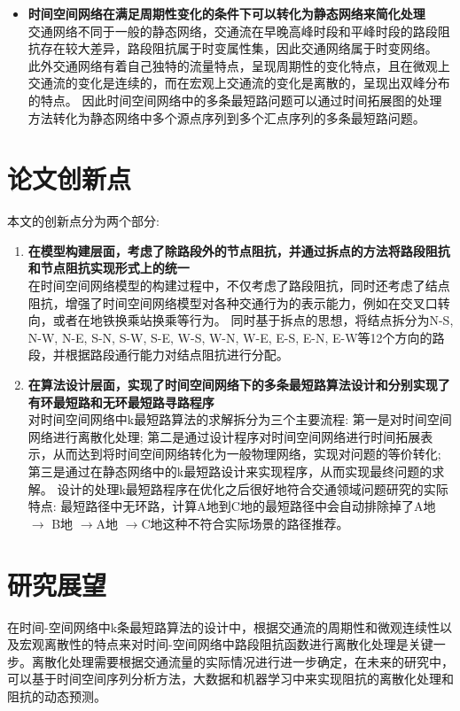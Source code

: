 \begin{itemize}
    \item \textbf{时间空间网络在满足周期性变化的条件下可以转化为静态网络来简化处理}\\
    交通网络不同于一般的静态网络，交通流在早晚高峰时段和平峰时段的路段阻抗存在较大差异，路段阻抗属于时变属性集，因此交通网络属于时变网络。
    此外交通网络有着自己独特的流量特点，呈现周期性的变化特点，且在微观上交通流的变化是连续的，而在宏观上交通流的变化是离散的，呈现出双峰分布的特点。
    因此时间空间网络中的多条最短路问题可以通过时间拓展图的处理方法转化为静态网络中多个源点序列到多个汇点序列的多条最短路问题。
\end{itemize}


\section{论文创新点}\label{sec:论文创新点}
本文的创新点分为两个部分:
\begin{enumerate}%
    \item \textbf{在模型构建层面，考虑了除路段外的节点阻抗，并通过拆点的方法将路段阻抗和节点阻抗实现形式上的统一}\\
    在时间空间网络模型的构建过程中，不仅考虑了路段阻抗，同时还考虑了结点阻抗，增强了时间空间网络模型对各种交通行为的表示能力，例如在交叉口转向，或者在地铁换乘站换乘等行为。
    同时基于拆点的思想，将结点拆分为N-S, N-W, N-E, S-N, S-W, S-E, W-S, W-N, W-E, E-S, E-N, E-W等12个方向的路段，并根据路段通行能力对结点阻抗进行分配。

    \item \textbf{在算法设计层面，实现了时间空间网络下的多条最短路算法设计和分别实现了有环最短路和无环最短路寻路程序}\\
    对时间空间网络中k最短路算法的求解拆分为三个主要流程: 第一是对时间空间网络进行离散化处理;
    第二是通过设计程序对时间空间网络进行时间拓展表示，从而达到将时间空间网络转化为一般物理网络，实现对问题的等价转化;
    第三是通过在静态网络中的k最短路设计来实现程序，从而实现最终问题的求解。
    设计的处理k最短路程序在优化之后很好地符合交通领域问题研究的实际特点: 最短路径中无环路，计算A地到C地的最短路径中会自动排除掉了A地 $\to$ B地 $\to$A地 $\to$C地这种不符合实际场景的路径推荐。

\end{enumerate}


\section{研究展望}\label{sec:研究展望}
在时间-空间网络中k条最短路算法的设计中，根据交通流的周期性和微观连续性以及宏观离散性的特点来对时间-空间网络中路段阻抗函数进行离散化处理是关键一步。离散化处理需要根据交通流量的实际情况进行进一步确定，在未来的研究中，可以基于时间空间序列分析方法，大数据和机器学习中来实现阻抗的离散化处理和阻抗的动态预测。


